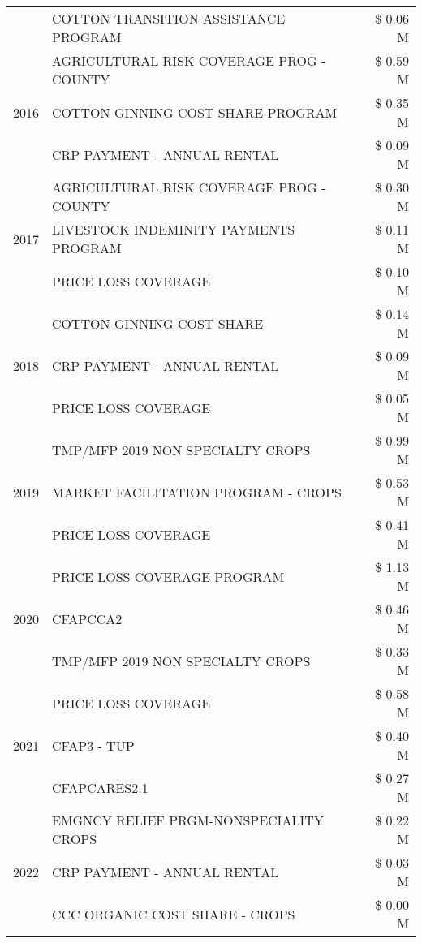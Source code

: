 \begin{tabular}{llr}
 & COTTON TRANSITION ASSISTANCE PROGRAM & \$ 0.06 M \\
\cline{1-3}
\multirow[t]{3}{*}{2016} & AGRICULTURAL RISK COVERAGE PROG - COUNTY & \$ 0.59 M \\
 & COTTON GINNING COST SHARE PROGRAM & \$ 0.35 M \\
 & CRP PAYMENT - ANNUAL RENTAL & \$ 0.09 M \\
\cline{1-3}
\multirow[t]{3}{*}{2017} & AGRICULTURAL RISK COVERAGE PROG - COUNTY & \$ 0.30 M \\
 & LIVESTOCK INDEMINITY PAYMENTS PROGRAM & \$ 0.11 M \\
 & PRICE LOSS COVERAGE & \$ 0.10 M \\
\cline{1-3}
\multirow[t]{3}{*}{2018} & COTTON GINNING COST SHARE & \$ 0.14 M \\
 & CRP PAYMENT - ANNUAL RENTAL & \$ 0.09 M \\
 & PRICE LOSS COVERAGE & \$ 0.05 M \\
\cline{1-3}
\multirow[t]{3}{*}{2019} & TMP/MFP 2019 NON SPECIALTY CROPS & \$ 0.99 M \\
 & MARKET FACILITATION PROGRAM - CROPS & \$ 0.53 M \\
 & PRICE LOSS COVERAGE & \$ 0.41 M \\
\cline{1-3}
\multirow[t]{3}{*}{2020} & PRICE LOSS COVERAGE PROGRAM & \$ 1.13 M \\
 & CFAPCCA2 & \$ 0.46 M \\
 & TMP/MFP 2019 NON SPECIALTY CROPS & \$ 0.33 M \\
\cline{1-3}
\multirow[t]{3}{*}{2021} & PRICE LOSS COVERAGE & \$ 0.58 M \\
 & CFAP3 - TUP & \$ 0.40 M \\
 & CFAPCARES2.1 & \$ 0.27 M \\
\cline{1-3}
\multirow[t]{3}{*}{2022} & EMGNCY RELIEF PRGM-NONSPECIALITY CROPS & \$ 0.22 M \\
 & CRP PAYMENT - ANNUAL RENTAL & \$ 0.03 M \\
 & CCC ORGANIC COST SHARE - CROPS & \$ 0.00 M \\
\cline{1-3}
\bottomrule
\end{tabular}
